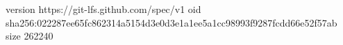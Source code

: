version https://git-lfs.github.com/spec/v1
oid sha256:022287ee65fc862314a5154d3e0d3e1a1ee5a1cc98993f9287fcdd66e52f57ab
size 262240
